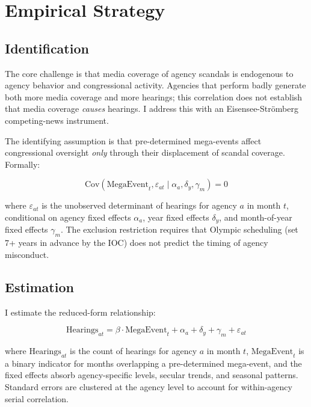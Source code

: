 \documentclass[12pt]{article}
\begin{document}
\section{Empirical Strategy}
\label{sec:strategy}

\subsection{Identification}

The core challenge is that media coverage of agency scandals is endogenous to agency behavior and congressional activity. Agencies that perform badly generate both more media coverage and more hearings; this correlation does not establish that media coverage \textit{causes} hearings. I address this with an Eisensee-Str\"{o}mberg competing-news instrument.

The identifying assumption is that pre-determined mega-events affect congressional oversight \textit{only} through their displacement of scandal coverage. Formally:

\begin{equation}
\text{Cov}(\text{MegaEvent}_t, \varepsilon_{at} \mid \alpha_a, \delta_y, \gamma_m) = 0
\end{equation}

\noindent where $\varepsilon_{at}$ is the unobserved determinant of hearings for agency $a$ in month $t$, conditional on agency fixed effects $\alpha_a$, year fixed effects $\delta_y$, and month-of-year fixed effects $\gamma_m$. The exclusion restriction requires that Olympic scheduling (set 7+ years in advance by the IOC) does not predict the timing of agency misconduct.

\subsection{Estimation}

I estimate the reduced-form relationship:

\begin{equation}
\text{Hearings}_{at} = \beta \cdot \text{MegaEvent}_t + \alpha_a + \delta_y + \gamma_m + \varepsilon_{at}
\label{eq:rf}
\end{equation}

\noindent where $\text{Hearings}_{at}$ is the count of hearings for agency $a$ in month $t$, $\text{MegaEvent}_t$ is a binary indicator for months overlapping a pre-determined mega-event, and the fixed effects absorb agency-specific levels, secular trends, and seasonal patterns. Standard errors are clustered at the agency level to account for within-agency serial correlation.
\end{document}
